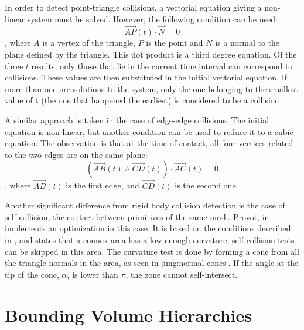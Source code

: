 In order to detect point-triangle collisions, a vectorial equation giving a non-linear system must be solved. However, the following condition can be used: \[\overrightarrow{AP}(t) \cdot \overrightarrow{N} = 0\], where $A$ is a vertex of the triangle, $P$ is the point and $N$ is a normal to the plane defined by the triangle. This dot product is a third degree equation. Of the three $t$ results, only those that lie in the current time interval can correspond to collisions. These values are then substituted in the initial vectorial equation. If more than one are solutions to the system, only the one belonging to the smallest value of t (the one that happened the earliest) is considered to be a collision \citep{provot97}.

A similar approach is taken in the case of edge-edge collisions. The initial equation is non-linear, but another condition can be used to reduce it to a cubic equation. The observation is that at the time of contact, all four vertices related to the two edges are on the same plane: \[(\overrightarrow{AB}(t) \wedge \overrightarrow{CD}(t)) \cdot \overrightarrow{AC}(t) = 0\], where $\overrightarrow{AB}(t)$ is the first edge, and $\overrightarrow{CD}(t)$ is the second one.


\label{lab:ncones}
Another significant difference from rigid body collision detection is the case of self-collision, the contact between primitives of the same mesh. Provot, in \citep{provot97} implements an optimization in this case. It is based on the conditions described in \citep{vmt94}, and states that a connex area has a low enough curvature, self-collision tests can be skipped in this area. The curvature test is done by forming a cone from all the triangle normals in the area, as seen in \autoref{img:normal-cones}. If the angle at the tip of the cone, $\alpha$, is lower than $\pi$, the zone cannot self-intersect.






\FloatBarrier
\section{Bounding Volume Hierarchies}
\label{sec:bvh}


